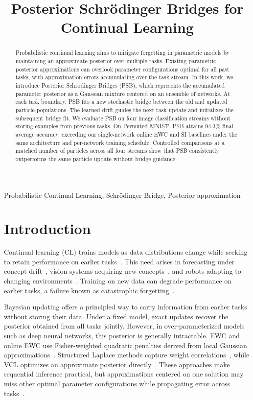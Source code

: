 \documentclass{article}
\title{Posterior Schrödinger Bridges for Continual Learning}
\begin{document}
\ninept
%
\maketitle
%
\begin{abstract}
Probabilistic continual learning aims to mitigate forgetting in parametric models by maintaining an approximate posterior over multiple tasks. Existing parametric posterior approximations can overlook parameter configurations optimal for all past tasks, with approximation errors accumulating over the task stream. In this work, we introduce Posterior Schr\"odinger Bridges (PSB), which represents the accumulated parameter posterior as a Gaussian mixture centered on an ensemble of networks. At each task boundary, PSB fits a new stochastic bridge between the old and updated particle populations. The learned drift guides the next task update and initializes the subsequent bridge fit. We evaluate PSB on four image classification streams without storing examples from previous tasks. On Permuted MNIST, PSB attains $94.3\%$ final average accuracy, exceeding our single-network online EWC and SI baselines under the same architecture and per-network training schedule. Controlled comparisons at a matched number of particles across all four streams show that PSB consistently outperforms the same particle update without bridge guidance.
\end{abstract}
%
\begin{keywords}
Probabilistic Continual Learning, Schr\"odinger Bridge, Posterior approximation
\end{keywords}
%
\section{Introduction}
\label{sec:intro}

Continual learning (CL) trains models as data distributions change while
seeking to retain performance on earlier tasks~\cite{vandeven2022types}.
This need arises in forecasting under concept drift~\cite{osti_10695974,pham2023fsnet}, vision systems acquiring new concepts~\cite{rebuffi2017icarl,aljundi2019taskfree,mai2022online}, and robots adapting to changing environments~\cite{lesort2020robotics}.
Training on new data can degrade performance on earlier tasks, a failure known as catastrophic forgetting~\cite{mccloskey1989catastrophic}.

Bayesian updating offers a principled way to carry information from
earlier tasks without storing their data. Under a fixed model, exact
updates recover the posterior obtained from all tasks jointly. However, in over-parameterized models such as deep neural networks, this posterior is generally intractable. EWC and online EWC use
Fisher-weighted quadratic penalties derived from local Gaussian
approximations~\cite{kirkpatrick2017ewc,schwarz2018progress}.
Structured Laplace methods capture weight correlations~\cite{ritter2018laplace}, while VCL optimizes an approximate posterior
directly~\cite{nguyen2018vcl}. These approaches make sequential
inference practical, but approximations centered on one solution may
miss other optimal parameter configurations while propagating error
across tasks~\cite{wilson2020bayesian,kessler2023sequential}.
\end{document}
